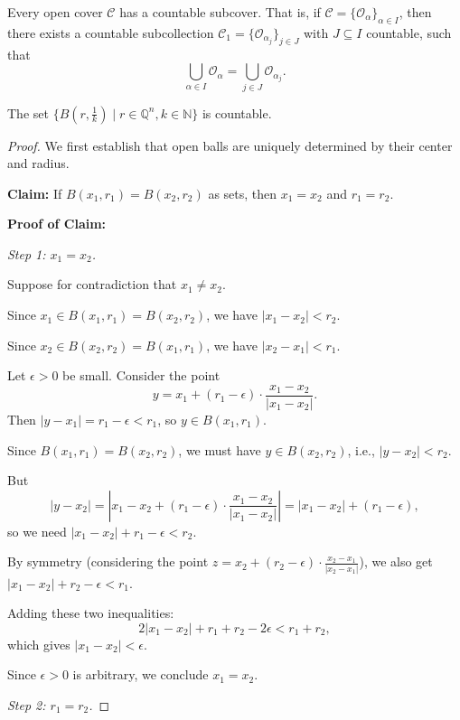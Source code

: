 \documentclass[11pt]{report}
\begin{document}
\begin{thmbox}
Every open cover $\mathcal{C}$ has a countable subcover. That is, if $\mathcal{C} = \{\mathcal{O}_\alpha\}_{\alpha \in I}$, then there exists a countable subcollection $\mathcal{C}_1 = \{\mathcal{O}_{\alpha_j}\}_{j \in J}$ with $J \subseteq I$ countable, such that
\[
\bigcup_{\alpha \in I} \mathcal{O}_\alpha = \bigcup_{j \in J} \mathcal{O}_{\alpha_j}.
\]
\end{thmbox}

\begin{lembox}
The set $\{B(r, \frac{1}{k}) \mid r \in \mathbb{Q}^n, k \in \mathbb{N}\}$ is countable.
\end{lembox}

\begin{proof}
We first establish that open balls are uniquely determined by their center and radius.

\textbf{Claim:} If $B(x_1, r_1) = B(x_2, r_2)$ as sets, then $x_1 = x_2$ and $r_1 = r_2$.

\textbf{Proof of Claim:}

\textit{Step 1: $x_1 = x_2$.}

Suppose for contradiction that $x_1 \neq x_2$.

Since $x_1 \in B(x_1, r_1) = B(x_2, r_2)$, we have $|x_1 - x_2| < r_2$.

Since $x_2 \in B(x_2, r_2) = B(x_1, r_1)$, we have $|x_2 - x_1| < r_1$.

Let $\epsilon > 0$ be small. Consider the point
\[
y = x_1 + (r_1 - \epsilon) \cdot \frac{x_1 - x_2}{|x_1 - x_2|}.
\]
Then $|y - x_1| = r_1 - \epsilon < r_1$, so $y \in B(x_1, r_1)$.

Since $B(x_1, r_1) = B(x_2, r_2)$, we must have $y \in B(x_2, r_2)$, i.e., $|y - x_2| < r_2$.

But
\[
|y - x_2| = \left| x_1 - x_2 + (r_1 - \epsilon) \cdot \frac{x_1 - x_2}{|x_1 - x_2|} \right| = |x_1 - x_2| + (r_1 - \epsilon),
\]
so we need $|x_1 - x_2| + r_1 - \epsilon < r_2$.

By symmetry (considering the point $z = x_2 + (r_2 - \epsilon) \cdot \frac{x_2 - x_1}{|x_2 - x_1|}$), we also get $|x_1 - x_2| + r_2 - \epsilon < r_1$.

Adding these two inequalities:
\[
2|x_1 - x_2| + r_1 + r_2 - 2\epsilon < r_1 + r_2,
\]
which gives $|x_1 - x_2| < \epsilon$.

Since $\epsilon > 0$ is arbitrary, we conclude $x_1 = x_2$.

\textit{Step 2: $r_1 = r_2$.}


\end{proof}
\end{document}
